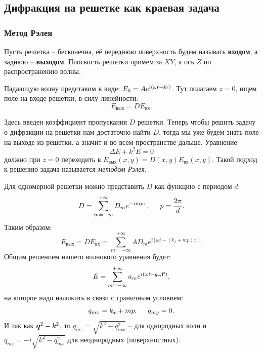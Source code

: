 \subsection{Дифракция на решетке как краевая задача}

\subsubsection{Метод Рэлея}
Пусть решетка -- бесконечна, её переднюю поверхность будем называть \textbf{входом}, а заднюю -- \textbf{выходом}. Плоскость решетки примем за $XY$, а ось $Z$ по распространению волны.

Падающую волну представим в виде: $E_0 = A e^{i (\omega t - \smallvc{k} \smallvc{r})}$.
Тут полагаем $z = 0$, ищем поле на входе решетки, в силу линейности: 
\begin{equation*}
	E_{\text{вых}} = D E_{\text{вх}}.	
\end{equation*}	


Здесь введен коэффициент пропускания $D$ решетки. 
Теперь чтобы решить задачу о дифракции на решетки нам достаточно найти $D$, тогда мы уже будем знать поле на выходе из решетки, а значит и во всем пространстве дальше. Уравнение
\begin{equation*}
	\Delta E + k^2 E = 0
\end{equation*}
должно при $z = 0$ переходить в $E_{\text{вых}}(x,y) = D(x,y) E_{\text{вх}}(x,y)$. Такой подход к решению задача называется \textit{методом Рэлея}.

Для одномерной решетки можно представить $D$ как функцию с периодом $d$:
\begin{equation*}
	D = \sum_{m =- \infty}^{+\infty}D_m e^{-i m p x},
	\hspace{0.5 cm}
	p =\frac{2 \pi}{d}.
\end{equation*}
Таким образом:
\begin{equation*}
	E_\text{вых} = D E_\text{вх} = \sum_{m = - \infty}^{+\infty} A D_m e^{i [\omega t - (k_x + m p)x]}.
\end{equation*}
Общим решением нашего волнового уравнения будет:
\begin{equation*}
	E = \sum_{m = - \infty}^{+\infty} a_m e^{i(\omega t - \smallvc{q_m} \vc{r})},
\end{equation*}
на которое надо наложить в связи с граничным условием:
\begin{equation*}
	q_{mx} = k_x + m p, \hspace{0.5 cm} q_{m y} = 0.
\end{equation*}
И так как $\mbox{\boldmath $q$}^2 - k^2$, то $q_{mz} = \sqrt{k^2 - q_{mx}^2}$ -- для однородных волн и $q_{mz} = -i \sqrt{k^2 - q_{mx}^2}$ для неоднородных (поверхностных).

